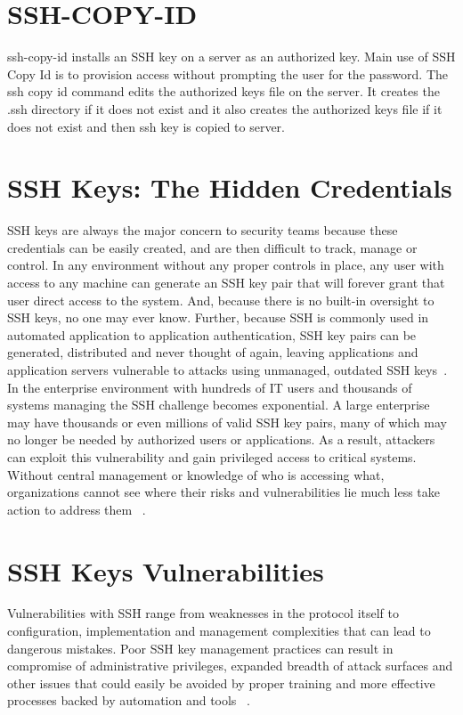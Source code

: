 \section{SSH-COPY-ID}
ssh-copy-id installs an SSH key on a server as an authorized key. 
Main use of SSH Copy Id is to provision access without prompting
the user for the password. The ssh copy id command edits the 
authorized keys file on the server. It creates the .ssh directory 
if it does not exist and it also creates the authorized keys file
if it does not exist and then ssh key is copied to server.

\section{SSH Keys: The Hidden Credentials} 
SSH keys are always the major concern to security teams because 
these credentials can be easily created, and are then difficult to
track, manage or control. In any environment without any proper
controls in place, any user with access to any machine can generate
an SSH key pair that will forever grant that user direct access to
the system. And, because there is no built-in oversight to SSH keys,
no one may ever know. Further, because SSH is commonly used in 
automated application to application authentication,
SSH key pairs can be generated, distributed and never thought of again, 
leaving applications and application servers vulnerable to attacks 
using unmanaged, outdated SSH keys~\cite{hid-sp18-513-cyberark}. 
In the enterprise environment with hundreds of IT users and 
thousands of systems managing the SSH challenge becomes exponential. 
A large enterprise may have thousands or even millions of valid 
SSH key pairs, many of which may no longer be needed by authorized 
users or applications. As a result, attackers can exploit this 
vulnerability and gain privileged access to critical systems. 
Without central management or knowledge of who 
is accessing what, organizations cannot see where their risks and
vulnerabilities lie much less take action to address them
~\cite{hid-sp18-513-cyberark}. 

\section{SSH Keys Vulnerabilities}
Vulnerabilities with SSH range from weaknesses in the protocol
itself to configuration, implementation and management 
complexities that can lead to dangerous mistakes.
Poor SSH key management practices can result in compromise 
of administrative privileges, expanded breadth of attack surfaces
and other issues that could easily be avoided by proper training
and more effective processes backed by automation and tools
~\cite{hid-sp18-513-sans}.

